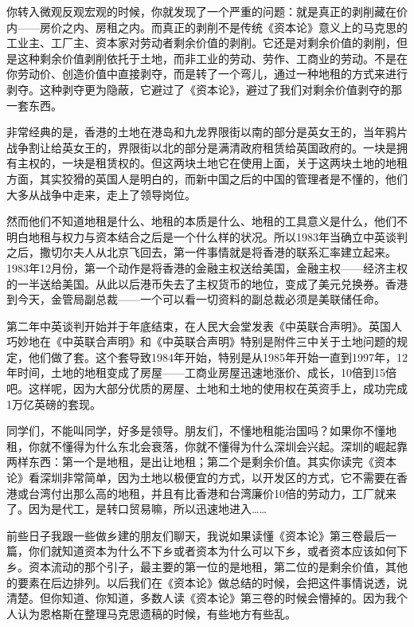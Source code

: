 \documentclass[UTF8, 12pt, a4paper]{ctexrep}
\begin{document}
你转入微观反观宏观的时候，你就发现了一个严重的问题：就是真正的剥削藏在价内——房价之内、房租之内。而真正的剥削不是传统《资本论》意义上的马克思的工业主、工厂主、资本家对劳动者剩余价值的剥削。它还是对剩余价值的剥削，但是这种剩余价值剥削依托于土地，而非工业的劳动、劳作、工商业的劳动。不是在你劳动价、创造价值中直接剥夺，而是转了一个弯儿，通过一种地租的方式来进行剥夺。这种剥夺更为隐蔽，它避过了《资本论》，避过了我们对剩余价值剥夺的那一套东西。

非常经典的是，香港的土地在港岛和九龙界限街以南的部分是英女王的，当年鸦片战争割让给英女王的，界限街以北的部分是满清政府租赁给英国政府的。一块是拥有主权的，一块是租赁权的。但这两块土地它在使用上面，关于这两块土地的地租方面，其实狡猾的英国人是明白的，而新中国之后的中国的管理者是不懂的，他们大多从战争中走来，走上了领导岗位。

然而他们不知道地租是什么、地租的本质是什么、地租的工具意义是什么，他们不明白地租与权力与资本结合之后是一个什么样的状况。所以1983年当确立中英谈判之后，撒切尔夫人从北京飞回去，第一件事情就是将香港的联系汇率建立起来。1983年12月份，第一个动作是将香港的金融主权送给美国，金融主权——经济主权的一半送给美国。从此以后港币失去了主权货币的地位，变成了美元兑换券。香港到今天，金管局副总裁——一个可以看一切资料的副总裁必须是美联储任命。

第二年中英谈判开始并于年底结束，在人民大会堂发表《中英联合声明》。英国人巧妙地在《中英联合声明》和《中英联合声明》特别是附件三中关于土地问题的规定，他们做了套。这个套导致1984年开始，特别是从1985年开始一直到1997年，12年时间，土地的地租变成了房屋——工商业房屋迅速地涨价、成长，10倍到15倍吧。这样呢，因为大部分优质的房屋、土地和土地的使用权在英资手上，成功完成1万亿英磅的套现。

同学们，不能叫同学，好多是领导。朋友们，不懂地租能治国吗？如果你不懂地租，你就不懂得为什么东北会衰落，你就不懂得为什么深圳会兴起。深圳的崛起靠两样东西：第一个是地租，是出让地租；第二个是剩余价值。其实你读完《资本论》看深圳非常简单，因为土地以极便宜的方式，以开发区的方式，它不需要在香港或台湾付出那么高的地租，并且有比香港和台湾廉价10倍的劳动力，工厂就来了。因为是代工，是转口贸易嘛，所以迅速地进入……

前些日子我跟一些做乡建的朋友们聊天，我说如果读懂《资本论》第三卷最后一篇，你们就知道资本为什么不下乡或者资本为什么可以下乡，或者资本应该如何下乡。资本流动的那个引子，最主要的第一位的是地租，第二位的是剩余价值，其他的要素在后边排列。以后我们在《资本论》做总结的时候，会把这件事情说透，说清楚。但你知道、你知道，多数人读《资本论》第三卷的时候会懵掉的。因为我个人认为恩格斯在整理马克思遗稿的时候，有些地方有些乱。
\end{document}
